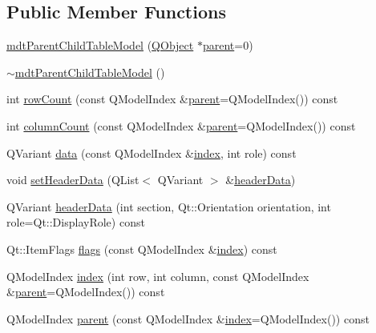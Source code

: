 \subsection*{Public Member Functions}
\begin{DoxyCompactItemize}
\item 
\hyperlink{classmdt_parent_child_table_model_a6a02b85f8663bd913b23380381287c0b}{mdt\-Parent\-Child\-Table\-Model} (\hyperlink{class_q_object}{Q\-Object} $\ast$\hyperlink{classmdt_parent_child_table_model_aa4827005e9009f1b0fddf4ae962d6031}{parent}=0)
\item 
\hyperlink{classmdt_parent_child_table_model_abe9a228d3890a3228feeadc14217650e}{$\sim$mdt\-Parent\-Child\-Table\-Model} ()
\item 
int \hyperlink{classmdt_parent_child_table_model_a00ede0aa95a181c04aafffa56bd8f470}{row\-Count} (const Q\-Model\-Index \&\hyperlink{classmdt_parent_child_table_model_aa4827005e9009f1b0fddf4ae962d6031}{parent}=Q\-Model\-Index()) const 
\item 
int \hyperlink{classmdt_parent_child_table_model_a6d1941603fde6be4942439f22616249e}{column\-Count} (const Q\-Model\-Index \&\hyperlink{classmdt_parent_child_table_model_aa4827005e9009f1b0fddf4ae962d6031}{parent}=Q\-Model\-Index()) const 
\item 
Q\-Variant \hyperlink{classmdt_parent_child_table_model_aea9349919cafde88c33aa6ff8c68f4ff}{data} (const Q\-Model\-Index \&\hyperlink{classmdt_parent_child_table_model_abd2bd46910ca92c7b92ff24593bfa4d1}{index}, int role) const 
\item 
void \hyperlink{classmdt_parent_child_table_model_a639b9f817d3c67e913c1e758ceb15f12}{set\-Header\-Data} (Q\-List$<$ Q\-Variant $>$ \&\hyperlink{classmdt_parent_child_table_model_ac0fe230365b4685729886eb89c3bee2d}{header\-Data})
\item 
Q\-Variant \hyperlink{classmdt_parent_child_table_model_ac0fe230365b4685729886eb89c3bee2d}{header\-Data} (int section, Qt\-::\-Orientation orientation, int role=Qt\-::\-Display\-Role) const 
\item 
Qt\-::\-Item\-Flags \hyperlink{classmdt_parent_child_table_model_ad937c815fb4d3afdd7bf6a222e216b2c}{flags} (const Q\-Model\-Index \&\hyperlink{classmdt_parent_child_table_model_abd2bd46910ca92c7b92ff24593bfa4d1}{index}) const 
\item 
Q\-Model\-Index \hyperlink{classmdt_parent_child_table_model_abd2bd46910ca92c7b92ff24593bfa4d1}{index} (int row, int column, const Q\-Model\-Index \&\hyperlink{classmdt_parent_child_table_model_aa4827005e9009f1b0fddf4ae962d6031}{parent}=Q\-Model\-Index()) const 
\item 
Q\-Model\-Index \hyperlink{classmdt_parent_child_table_model_aa4827005e9009f1b0fddf4ae962d6031}{parent} (const Q\-Model\-Index \&\hyperlink{classmdt_parent_child_table_model_abd2bd46910ca92c7b92ff24593bfa4d1}{index}=Q\-Model\-Index()) const 
\end{DoxyCompactItemize}


